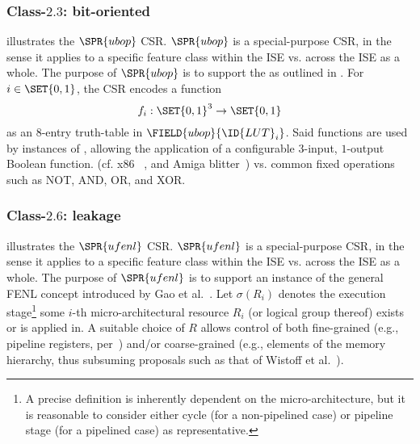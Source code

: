 
\subsubsection{Class-$2.3$: bit-oriented}
\label{sec:spec:state:2:3}

illustrates the 
$\SPR{ubop}$
CSR.
$\SPR{ubop}$
is a special-purpose CSR, in the sense it applies 
to a specific feature class within the ISE
vs.
across the ISE as a whole.
The purpose of 
$\SPR{ubop}$
is to support the
as outlined in 
.
For $i \in \SET{ 0, 1 }$, the CSR encodes a function
\[
f_i : \SET{ 0, 1 }^3 \rightarrow \SET{ 0, 1 }
\]
as an $8$-entry truth-table in $\FIELD{ubop}{\ID{LUT}_{i}}$.
Said functions are used by instances of , allowing the
application of a configurable $3$-input, $1$-output Boolean function.
(cf. x86 ~\cite[5-446--5-468]{SCARV:X86:2:18}, and Amiga blitter~\cite[Chapter 6]{SCARV:Amiga:85})
vs. common fixed operations such as NOT, AND, OR, and XOR.


\subsubsection{Class-$2.6$: leakage}
\label{sec:spec:state:2:6}

illustrates the 
$\SPR{ufenl}$
CSR.
$\SPR{ufenl}$
is a special-purpose CSR, in the sense it applies 
to a specific feature class within the ISE
vs.
across the ISE as a whole.
The purpose of 
$\SPR{ufenl}$
is to support an instance of the general FENL concept introduced by 
Gao et al.~\cite{SCARV:GMPP:20}.
Let
$
\sigma( R_i )
$
denotes the execution stage\footnote{%
A precise definition is inherently dependent on the micro-architecture, 
but it is reasonable to consider either
cycle          (for a non-pipelined case)
or
pipeline stage (for a     pipelined case)
as representative.
} some $i$-th micro-architectural resource $R_i$ (or logical group 
thereof) exists or is applied in.
A suitable choice of $R$ allows control of both 
  fine-grained 
(e.g., pipeline registers, per~\cite{SCARV:GMPP:20})
and/or
coarse-grained
(e.g., elements of the memory hierarchy, thus subsuming proposals such as that of Wistoff et al.~\cite[Section 2.4]{SCARV:WSGBH:20}).

